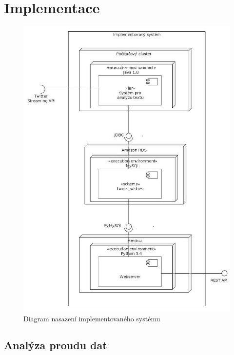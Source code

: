 \documentclass[thesis=B,czech]{FITthesis}[2012/06/26]
\begin{document}
\chapter{Implementace}
\begin{figure}[h]
   	\centering
   	\includegraphics[width=1\textwidth]{images/deployment.jpg}
   	\caption{Diagram nasazení implementovaného systému}
   	\label{fig:deployment_diagram}
\end{figure}

\section{Analýza proudu dat}
\label{analysis-implementation}
\end{document}
